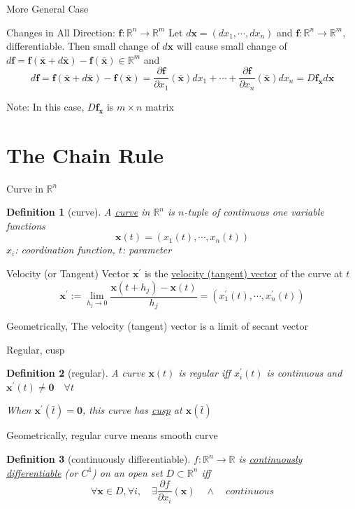 \documentclass[a4paper,11pt]{article}
\newtheorem{defn}{Definition}
\newcommand{\bb}{\mathbb}
\newcommand{\bd}{\mathbf}
\newcommand{\p}{\partial}
\begin{document}
\begin{frame}[t]{More General Case}
	\begin{block}
		{Changes in All Direction: $\bd f:\bb{R}^n\rightarrow \bb{R}^m$}
		Let $d \bd x = (d x_1, \cdots, d x_n)$ and $\bd f:\bb{R}^n\rightarrow\bb{R}^m$, differentiable. Then small change of $d\bd x$ will cause small change of $d\bd f=\bd f(\bar{\bd x} + d \bar{\bd x}) - \bd f(\bar{\bd x})\in\bb{R}^m$ and \[
			d\bd f = \bd f(\bar{\bd x} + d \bar{\bd x}) - \bd f(\bar{\bd x}) = \frac{\p \bd f}{\p x_1}(\bar{\bd x})dx_1 + \cdots +\frac{\p \bd f}{\p x_n}(\bar{\bd x})dx_n= D\bd f_{\bd x} d\bd x
		\]
	\end{block}
	Note: In this case, $D\bd f_{\bd x}$ is $m\times n$ matrix
\end{frame}
\section{The Chain Rule} %
\label{sec:the_chain_rule}
\begin{frame}[t]{Curve in $\bb{R}^n$}
	\begin{defn}
		[curve] A \uline{curve} in $\bb{R}^n$ is $n$-tuple of continuous one variable functions\[
			\bd x(t) = (x_1(t),\cdots,x_n(t))
		\]
		$x_i$: coordination function, $t$: parameter
	\end{defn}
	\begin{block}
		{Velocity (or Tangent) Vector}
		$\bd{x}^\prime$ is the \uline{velocity (tangent) vector} of the curve at $t$\[
			\bd{x}^\prime := \lim_{h_j\rightarrow 0}\frac{\bd{x}(t+h_j)-\bd{x}(t)}{h_j}=(x_1^\prime(t),\cdots,x_n^\prime(t))
		\]
	\end{block}
	Geometrically, The velocity (tangent) vector is a limit of secant vector
\end{frame}
\begin{frame}[t]{Regular, cusp}
	\begin{defn}
		[regular] A curve $\bd x(t)$ is regular iff $x_i^\prime(t) $ is continuous and $\bd x^\prime(t)\neq \bd{0}\quad \forall t$

		When $\bd x^\prime(\bar t) = \bd{0}$, this curve has \uline{cusp} at $\bd{x}(\bar t)$
	\end{defn}
	Geometrically, regular curve means smooth curve

	\begin{defn}
		[continuously differentiable] $f:\bb{R}^n\rightarrow\bb{R}$ is \uline{continuously differentiable} (or $C^1$) on an open set $ D\subset\bb{R}^n$ iff \[
			\forall\bd x\in D, \forall i, \quad \exists \frac{\p f}{\p x_i}(\bd x) \quad\land\quad continuous
		\]
	\end{defn}
\end{frame}
\end{document}

